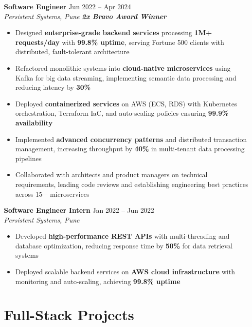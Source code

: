 \documentclass[a4paper,10pt]{article}
\begin{document}
\textbf{Software Engineer} \hfill Jun 2022 – Apr 2024 \\
\textit{Persistent Systems, Pune} \hfill \textit{\textbf{2x Bravo Award Winner}}
\begin{itemize}
    \item Designed \textbf{enterprise-grade backend services} processing \textbf{1M+ requests/day} with \textbf{99.8\% uptime}, serving Fortune 500 clients with distributed, fault-tolerant architecture
    \item Refactored monolithic systems into \textbf{cloud-native microservices} using Kafka for big data streaming, implementing semantic data processing and reducing latency by \textbf{30\%}
    \item Deployed \textbf{containerized services} on AWS (ECS, RDS) with Kubernetes orchestration, Terraform IaC, and auto-scaling policies ensuring \textbf{99.9\% availability}
    \item Implemented \textbf{advanced concurrency patterns} and distributed transaction management, increasing throughput by \textbf{40\%} in multi-tenant data processing pipelines
    \item Collaborated with architects and product managers on technical requirements, leading code reviews and establishing engineering best practices across 15+ microservices
\end{itemize}

\vspace{1pt}

\textbf{Software Engineer Intern} \hfill Jan 2022 – Jun 2022 \\
\textit{Persistent Systems, Pune}
\begin{itemize}
    \item Developed \textbf{high-performance REST APIs} with multi-threading and database optimization, reducing response time by \textbf{50\%} for data retrieval systems
    \item Deployed scalable backend services on \textbf{AWS cloud infrastructure} with monitoring and auto-scaling, achieving \textbf{99.8\% uptime}
\end{itemize}

\vspace{-2pt}

\section*{Full-Stack Projects}
\vspace{-4pt}
\end{document}
